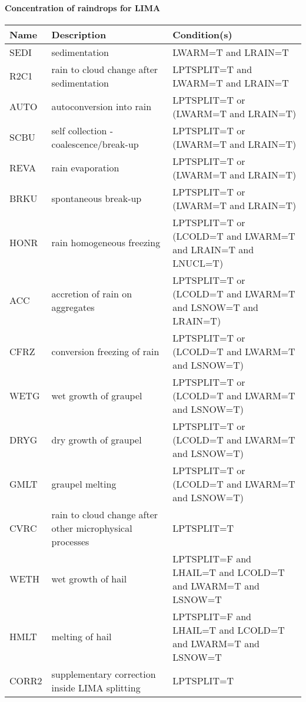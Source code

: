 \paragraph{Concentration of raindrops for LIMA}
\mbox{} %

\begin{longtable} {|p{}|p{}|p{}|}
\hline
Name & Description & Condition(s) \\
\hline \hline
SEDI   & sedimentation                                            & LWARM=T and LRAIN=T \\\hline
R2C1   & rain to cloud change after sedimentation                 & LPTSPLIT=T and LWARM=T and LRAIN=T \\\hline
AUTO   & autoconversion into rain                                 & LPTSPLIT=T or (LWARM=T and LRAIN=T) \\\hline
SCBU   & self collection - coalescence/break-up                   & LPTSPLIT=T or (LWARM=T and LRAIN=T) \\\hline
REVA   & rain evaporation                                         & LPTSPLIT=T or (LWARM=T and LRAIN=T) \\\hline
BRKU   & spontaneous break-up                                     & LPTSPLIT=T or (LWARM=T and LRAIN=T)        \\\hline
HONR   & rain homogeneous freezing                                & LPTSPLIT=T or (LCOLD=T and LWARM=T and LRAIN=T and LNUCL=T) \\\hline
ACC    & accretion of rain on aggregates                          & LPTSPLIT=T or (LCOLD=T and LWARM=T and LSNOW=T and LRAIN=T) \\\hline
CFRZ   & conversion freezing of rain                              & LPTSPLIT=T or (LCOLD=T and LWARM=T and LSNOW=T) \\\hline
WETG   & wet growth of graupel                                    & LPTSPLIT=T or (LCOLD=T and LWARM=T and LSNOW=T) \\\hline
DRYG   & dry growth of graupel                                    & LPTSPLIT=T or (LCOLD=T and LWARM=T and LSNOW=T) \\\hline
GMLT   & graupel melting                                          & LPTSPLIT=T or (LCOLD=T and LWARM=T and LSNOW=T) \\\hline
CVRC   & rain to cloud change after other microphysical processes & LPTSPLIT=T \\\hline
WETH   & wet growth of hail                                       & LPTSPLIT=F and LHAIL=T and LCOLD=T and LWARM=T and LSNOW=T \\\hline
HMLT   & melting of hail                                          & LPTSPLIT=F and LHAIL=T and LCOLD=T and LWARM=T and LSNOW=T \\\hline
CORR2  & supplementary correction inside LIMA splitting           & LPTSPLIT=T \\\hline
\endhead
\end{longtable}

